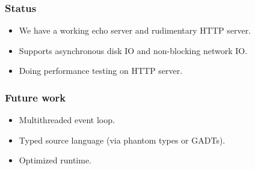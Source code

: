 \documentclass{beamer}
\begin{document}
\begin{frame}
\frametitle{Status}
\begin{itemize}
\item We have a working echo server and rudimentary HTTP server.
\item Supports asynchronous disk IO and non-blocking network IO.
\item Doing performance testing on HTTP server.
\end{itemize}
\end{frame}

\begin{frame}
\frametitle{Future work}
\begin{itemize}
\item Multithreaded event loop.
\item Typed source language (via phantom types or GADTs).
\item Optimized runtime.
\end{itemize}
\end{frame}
\end{document}
